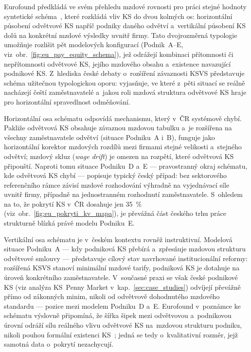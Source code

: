 Eurofound předkládá ve svém přehledu mzdové rovnosti pro práci stejné hodnoty syntetické schéma~\cite{eurofound_ca_pay_equity_2026}, které rozkládá vliv \acs{KS} do dvou kolmých os: horizontální působení odvětvové \ac{KS} napříč podniky daného odvětví a~vertikální působení \acs{KS} dolů na konkrétní mzdové výsledky uvnitř firmy.
Tato dvojrozměrná typologie umožňuje rozlišit pět modelových konfigurací (Podnik~A--E, viz~obr.~\ref{fig:eu_pay_equity_schema}), jež odrážejí kombinaci přítomnosti či nepřítomnosti odvětvové \acs{KS}, jejího mzdového obsahu a~existence navazující podnikové \acs{KS}.
Z~hlediska české debaty o~rozšíření závaznosti \acs{KSVS} představuje schéma užitečnou typologickou oporu: vyjasňuje, ve které z~pěti situací se reálně nacházejí čeští zaměstnavatelé a~jakou roli mzdová struktura odvětvové \acs{KS} hraje pro horizontální spravedlnost odměňování.

Horizontální osa schématu odpovídá mechanismu, který v~ČR systémově chybí.
Pakliže odvětvová \acs{KS} obsahuje závaznou mzdovou tabulku a~je rozšířena na všechny zaměstnavatele odvětví (situace Podniku~A i~B), funguje jako horizontální korektor mzdových rozdílů mezi firmami stejné velikosti a~stejného odvětví; mzdový skluz (\textit{wage drift}) je omezen na rozpětí, které odvětvová \acs{KS} připouští.
Naproti tomu situace Podniku~D a~E --- pravostranný okraj schématu, kde odvětvová \acs{KS} chybí --- popisuje typický český případ: bez sektorového referenčního rámce závisí mzdové rozhodování výhradně na vyjednávací síle uvnitř firmy, případně na jednostranném rozhodnutí zaměstnavatele.
S~ohledem na to, že pokrytí \acs{KS} v~ČR dosahuje jen \SI{35}{\percent} (viz~obr.~\ref{fig:eu_pokryti_kv_mapa}), je převážná část českého trhu práce strukturně blízká právě modelu Podniku~E.

Vertikální osa schématu je v~českém kontextu rovněž instruktivní.
Modelová situace Podniku~A --- kdy podniková \acs{KS} přebírá a~zpřesňuje mzdovou strukturu odvětvové smlouvy --- představuje cílový stav navrhované institucionální reformy: rozšířená \acs{KSVS} stanoví minimální mzdové tarify, podniková \acs{KS} je dotahuje na úroveň konkrétního zaměstnavatele.
V~současné praxi se však české podnikové \acs{KS} (viz analýza KS~Penny Market v~kap.~\ref{sec:case_studies}) odvíjejí převážně přímo od zákonných minim, nikoli od odvětvově dohodnutého mzdového standardu --- pozice mezi modelem Podniku~D a~E.
Eurofound v~poznámce ke schématu výslovně připomíná, že šířka šipek mezi odvětvovou a~podnikovou úrovní odráží sílu reálného vlivu odvětvové \acs{KS} na~mzdovou strukturu podniku, nikoli pouhou formální existenci \acs{KS}~\cite{eurofound_ca_pay_equity_2026}; jedná se tedy o~kvalitativní rozměr, jejž samotná data o~pokrytí nezachycují.


